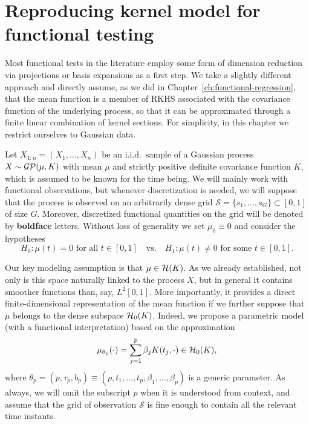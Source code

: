 \section{Reproducing kernel model for functional testing}\label{sec:rkhs-test}

Most functional tests in the literature employ some form of dimension reduction via projections or basis expansions as a first step. We take a slightly different approach and directly assume, as we did in Chapter~\ref{ch:functional-regression}, that the mean function is a member of \acs{RKHS} associated with the covariance function of the underlying process, so that it can be approximated through a finite linear combination of kernel sections. For simplicity, in this chapter we restrict ourselves to Gaussian data.

Let \(X_{1:n}=(X_1,\dots, X_n)\) be an i.i.d.\ sample of a Gaussian process \(X\sim \operatorname{\mathcal{GP}}(\mu, K)\) with mean \(\mu\) and strictly positive definite covariance function \(K\), which is assumed to be known for the time being. We will mainly work with functional observations, but whenever discretization is needed, we will suppose that the process is observed on an arbitrarily dense grid \(\mathcal S=\{s_1,\dots, s_G\}\subset [0,1]\) of size \(G\). Moreover, discretized functional quantities on the grid will be denoted by \textbf{boldface} letters. Without loss of generality we set \(\mu_0\equiv 0\) and consider the hypotheses
\[
H_0: \mu(t)=0 \text{ for all } t \in [0,1] \quad \text{vs.} \quad H_1: \mu(t)\neq 0 \text{ for some } t \in [0,1].
\]

Our key modeling assumption is that \(\mu\in\mathcal{H}(K)\). As we already established, not only is this space naturally linked to the process \(X\), but in general it contains smoother functions than, say, \(L^2[0,1]\). More importantly, it provides a direct finite-dimensional representation of the mean function if we further suppose that \(\mu\) belongs to the dense subspace \(\mathcal{H}_0(K)\). Indeed, we propose a parametric model (with a functional interpretation) based on the approximation
\begin{equation}\label{eq:mu-h0}
\mu_{\theta_p}(\cdot) = \sum_{j=1}^p \beta_j K(t_j, \cdot) \in \mathcal{H}_0(K),
\end{equation}
where \(\theta_p=(p, \tau_p, b_p) \equiv (p, t_1,\dots, t_p, \beta_1,\dots,\beta_p)\) is a generic parameter. As always, we will omit the subscript \(p\) when it is understood from context, and assume that the grid of observation \(\mathcal S\) is fine enough to contain all the relevant time instants.

